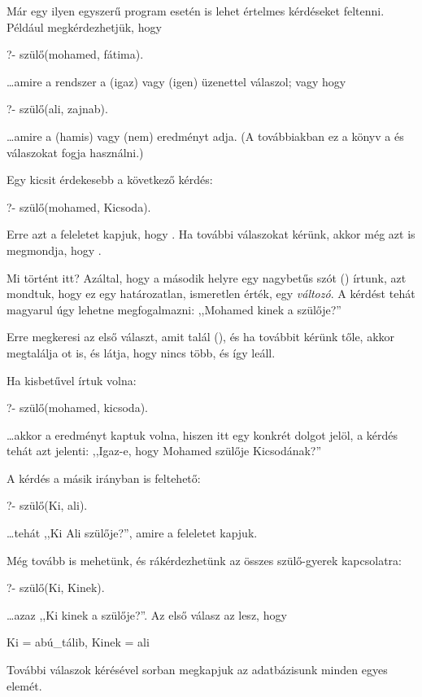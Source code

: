 Már egy ilyen egyszerű program esetén is lehet
értelmes kérdéseket feltenni. Például
megkérdezhetjük, hogy
\begin{query}
?- szülő(mohamed, fátima).
\end{query}
\dots amire a rendszer a  (igaz) vagy
 (igen) üzenettel
válaszol; vagy hogy
\begin{query}
?- szülő(ali, zajnab).
\end{query}
\dots amire a  (hamis) vagy  (nem)
eredményt adja. (A
továbbiakban ez a könyv a  és 
válaszokat fogja használni.)

Egy kicsit érdekesebb a következő kérdés:
\begin{query}
?- szülő(mohamed, Kicsoda).
\end{query}
Erre azt a feleletet kapjuk, hogy . Ha további válaszokat kérünk, akkor még
azt is megmondja, hogy .

Mi történt itt? Azáltal, hogy a második helyre egy
nagybetűs szót () írtunk, azt mondtuk,
hogy ez egy határozatlan, ismeretlen érték, egy
\emph{változó}. A kérdést tehát
magyarul úgy lehetne megfogalmazni: ,,Mohamed kinek
a szülője?''

Erre megkeresi az első választ, amit talál
(), és ha továbbit kérünk tőle, akkor
megtalálja ot is, és látja, hogy nincs
több, és így leáll.

Ha kisbetűvel írtuk volna:
\begin{query}
?- szülő(mohamed, kicsoda).
\end{query}
\dots akkor a  eredményt kaptuk volna,
hiszen  itt egy konkrét dolgot jelöl, a
kérdés tehát azt jelenti: ,,Igaz-e, hogy Mohamed
szülője Kicsodának?''

A kérdés a másik irányban is feltehető:
\begin{query}
?- szülő(Ki, ali).
\end{query}
\dots tehát ,,Ki Ali szülője?'', amire a  feleletet kapjuk.

Még tovább is mehetünk, és rákérdezhetünk az összes
szülő-gyerek kapcsolatra:
\begin{query}
?- szülő(Ki, Kinek).
\end{query}
\dots azaz ,,Ki kinek a szülője?''. Az első válasz
az lesz, hogy
\begin{query}
Ki = abú_tálib,
Kinek = ali
\end{query}
További válaszok kérésével sorban megkapjuk az
adatbázisunk minden egyes elemét.

